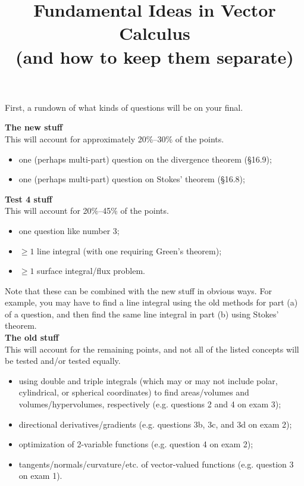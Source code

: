 \documentclass[12pt]{article}
\title{\vspace{-0.75in}\LARGE{Fundamental Ideas in Vector Calculus\\(and how to keep them separate)}\vspace{-1in}}
\date{}
\begin{document}
	\setlength\parskip{4.5mm}
	
	\maketitle
	
	\noindent First, a rundown of what kinds of questions will be on your final.
	
	\begin{adjustwidth}{0.25in}{0.25in}
		\noindent \textbf{The new stuff}\\[1.5mm]
		\noindent This will account for approximately 20\%--30\% of the points.
		\begin{itemize}[topsep=1.5mm,parsep=-4.5mm,itemsep=6mm]
			\item one (perhaps multi-part) question on the divergence theorem (\S 16.9);
			\item one (perhaps multi-part) question on Stokes' theorem (\S 16.8);
		\end{itemize}
	
		\noindent\textbf{Test 4 stuff}\\[1.5mm]
		This will account for 20\%--45\% of the points.
		\begin{itemize}[topsep=1.5mm,parsep=-4.5mm,itemsep=6mm]
			\item one question like number 3;
			\item $\geq 1$ line integral (with one requiring Green's theorem);
			\item $\geq 1$ surface integral/flux problem.
		\end{itemize}\vspace{-4.5mm}
		\noindent Note that these can be combined with the new stuff in obvious ways. For example, you may have to find a line integral using the old methods for part (a) of a question, and then find the same line integral in part (b) using Stokes' theorem.\\[-4.5mm]
	
		\noindent\textbf{The old stuff}\\[1.5mm]
		This will account for the remaining points, and not all of the listed concepts will be tested and/or tested equally.
		\begin{itemize}[topsep=1.5mm,parsep=-4.5mm,itemsep=6mm]
			\item using double and triple integrals (which may or may not include polar, cylindrical, or spherical coordinates) to find areas/volumes and volumes/hypervolumes, respectively (e.g. questions 2 and 4 on exam 3);
			\item directional derivatives/gradients (e.g. questions 3b, 3c, and 3d on exam 2);
			\item optimization of 2-variable functions (e.g. question 4 on exam 2);
			\item tangents/normals/curvature/etc. of vector-valued functions (e.g. question 3 on exam 1).
		\end{itemize}
	

\end{adjustwidth}
\end{document}
